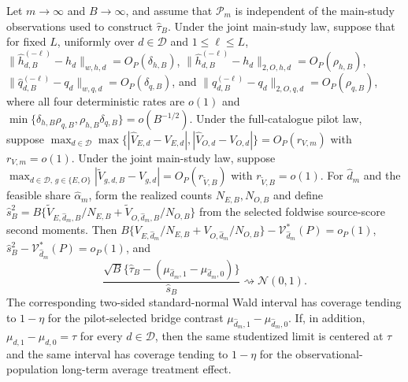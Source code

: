 Let \(m\to\infty\) and \(B\to\infty\), and assume that \(\mathcal P_m\) is independent of the main-study observations used to construct \(\widehat\tau_B\). Under the joint main-study law, suppose that for fixed \(L\), uniformly over \(d\in\mathcal D\) and \(1\le\ell\le L\), \(\|\widehat h_{d,B}^{(-\ell)}-h_d\|_{w,h,d}=O_P(\delta_{h,B})\), \(\|\widehat h_{d,B}^{(-\ell)}-h_d\|_{2,O,h,d}=O_P(\rho_{h,B})\), \(\|\widehat q_{d,B}^{(-\ell)}-q_d\|_{w,q,d}=O_P(\delta_{q,B})\), and \(\|\widehat q_{d,B}^{(-\ell)}-q_d\|_{2,O,q,d}=O_P(\rho_{q,B})\), where all four deterministic rates are \(o(1)\) and \(\min\{\delta_{h,B}\rho_{q,B},\rho_{h,B}\delta_{q,B}\}=o(B^{-1/2})\). Under the full-catalogue pilot law, suppose \(\max_{d\in\mathcal D}\max\{|\widehat V_{E,d}-V_{E,d}|,|\widehat V_{O,d}-V_{O,d}|\}=O_P(r_{V,m})\) with \(r_{V,m}=o(1)\). Under the joint main-study law, suppose \(\max_{d\in\mathcal D,\,g\in\{E,O\}}|\widetilde V_{g,d,B}-V_{g,d}|=O_P(r_{\widetilde V,B})\) with \(r_{\widetilde V,B}=o(1)\). For \(\widehat d_m\) and the feasible share \(\widehat\alpha_m\), form the realized counts \(N_{E,B},N_{O,B}\) and define \(\widehat s_B^2=B\{\widetilde V_{E,\widehat d_m,B}/N_{E,B}+\widetilde V_{O,\widehat d_m,B}/N_{O,B}\}\) from the selected foldwise source-score second moments. Then \(B\{V_{E,\widehat d_m}/N_{E,B}+V_{O,\widehat d_m}/N_{O,B}\}-\mathcal V_{\widehat d_m}^*(P)=o_P(1)\), \(\widehat s_B^2-\mathcal V_{\widehat d_m}^*(P)=o_P(1)\), and
\[
 \frac{\sqrt B\{\widehat\tau_B-(\mu_{\widehat d_m,1}-\mu_{\widehat d_m,0})\}}
 {\widehat s_B}\rightsquigarrow\mathcal N(0,1).
\]
The corresponding two-sided standard-normal Wald interval has coverage tending to \(1-\eta\) for the pilot-selected bridge contrast \(\mu_{\widehat d_m,1}-\mu_{\widehat d_m,0}\). If, in addition, \(\mu_{d,1}-\mu_{d,0}=\tau\) for every \(d\in\mathcal D\), then the same studentized limit is centered at \(\tau\) and the same interval has coverage tending to \(1-\eta\) for the observational-population long-term average treatment effect.
